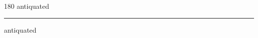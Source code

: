 
\begin{frame}
\begin{center}
\begin{turn}{180}
{\fontsize{2.5cm}{1em}\selectfont antiquated}
\end{turn}
\vspace{1em}\par  
\hrule
\vspace{1em}\par  
{\fontsize{2.5cm}{1em}\selectfont antiquated}
\end{center}
\end{frame}
